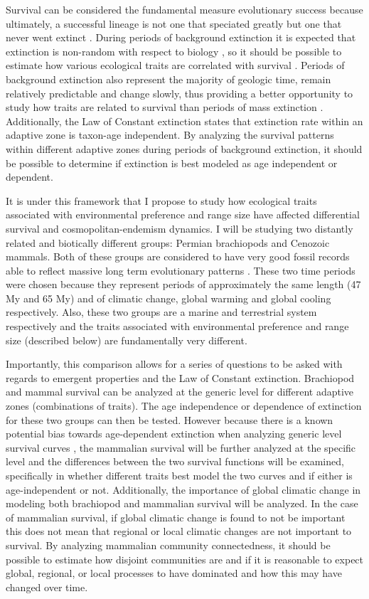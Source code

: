 \documentclass[12pt,letterpaper]{article}
\begin{document}
Survival can be considered the fundamental measure evolutionary success because ultimately, a successful lineage is not one that speciated greatly but one that never went extinct \citep{Cooper1984,Palmer2012}. During periods of background extinction it is expected that extinction is non-random with respect to biology \citep{Jablonski1986}, so it should be possible to estimate how various ecological traits are correlated with survival \citep{Kitchell1990,Kitchell1985a}. Periods of background extinction also represent the majority of geologic time, remain relatively predictable and change slowly, thus providing a better opportunity to study how traits are related to survival than periods of mass extinction \citep{Jablonski1986,Raup1988}. Additionally, the Law of Constant extinction \citep{VanValen1973} states that extinction rate within an adaptive zone is taxon-age independent. By analyzing the survival patterns within different adaptive zones during periods of background extinction, it should be possible to determine if extinction is best modeled as age independent or dependent. 

It is under this framework that I propose to study how ecological traits associated with environmental preference and range size have affected differential survival and cosmopolitan-endemism dynamics. I will be studying two distantly related and biotically different groups: Permian brachiopods and Cenozoic mammals. Both of these groups are considered to have very good fossil records able to reflect massive long term evolutionary patterns \citep{Mark1977}. These two time periods were chosen because they represent periods of approximately the same length (47 My and 65 My) and of climatic change, global warming and global cooling respectively. Also, these two groups are a marine and terrestrial system respectively and the traits associated with environmental preference and range size (described below) are fundamentally very different. 

Importantly, this comparison allows for a series of questions to be asked with regards to emergent properties and the Law of Constant extinction. Brachiopod and mammal survival can be analyzed at the generic level for different adaptive zones (combinations of traits). The age independence or dependence of extinction for these two groups can then be tested. However because there is a known potential bias towards age-dependent extinction when analyzing generic level survival curves \citep{Simpson2006,Raup1978,Raup1991a}, the mammalian survival will be further analyzed at the specific level and the differences between the two survival functions will be examined, specifically in whether different traits best model the two curves and if either is age-independent or not. Additionally, the importance of global climatic change in modeling both brachiopod and  mammalian survival will be analyzed. In the case of mammalian survival, if global climatic change is found to not be important this does not mean that regional or local climatic changes are not important to survival. By analyzing mammalian community connectedness, it should be possible to estimate how disjoint communities are and if it is reasonable to expect global, regional, or local processes to have dominated and how this may have changed over time.
\end{document}
